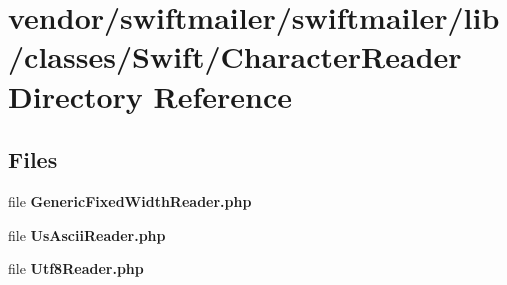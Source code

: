 \section{vendor/swiftmailer/swiftmailer/lib/classes/\+Swift/\+Character\+Reader Directory Reference}
\label{dir_e7f7369d244621a6eaf2e7b1b13ad37c}
\subsection*{Files}
\begin{DoxyCompactItemize}
\item 
file {\bf Generic\+Fixed\+Width\+Reader.\+php}
\item 
file {\bf Us\+Ascii\+Reader.\+php}
\item 
file {\bf Utf8\+Reader.\+php}
\end{DoxyCompactItemize}

